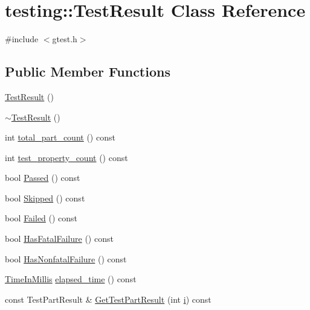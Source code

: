 \hypertarget{classtesting_1_1_test_result}{}\section{testing\+::Test\+Result Class Reference}
\label{classtesting_1_1_test_result}


{\ttfamily \#include $<$gtest.\+h$>$}

\subsection*{Public Member Functions}
\begin{DoxyCompactItemize}
\item 
\mbox{\hyperlink{classtesting_1_1_test_result_a5cf5dd6f416b7334ea601aab21a2fda5}{Test\+Result}} ()
\item 
\mbox{\hyperlink{classtesting_1_1_test_result_a41f407680b725b75d7eadc3230bc3315}{$\sim$\+Test\+Result}} ()
\item 
int \mbox{\hyperlink{classtesting_1_1_test_result_a6174aa4019dcda7c34d776b5741c9032}{total\+\_\+part\+\_\+count}} () const
\item 
int \mbox{\hyperlink{classtesting_1_1_test_result_afe4523257bbea8bc63b0950b702790be}{test\+\_\+property\+\_\+count}} () const
\item 
bool \mbox{\hyperlink{classtesting_1_1_test_result_acf7e6e72f05a0545c48ea48e7f8851df}{Passed}} () const
\item 
bool \mbox{\hyperlink{classtesting_1_1_test_result_a4c9e954e0f8c1386206f2e6208c45244}{Skipped}} () const
\item 
bool \mbox{\hyperlink{classtesting_1_1_test_result_afacc37e8b43c8574e4101bc61723c769}{Failed}} () const
\item 
bool \mbox{\hyperlink{classtesting_1_1_test_result_a30e00d4076ae07fb5ad7b623d9dc1fe4}{Has\+Fatal\+Failure}} () const
\item 
bool \mbox{\hyperlink{classtesting_1_1_test_result_a510564fa67b485ed4589a259f2a032d6}{Has\+Nonfatal\+Failure}} () const
\item 
\mbox{\hyperlink{namespacetesting_a992de1d091ce660f451d1e8b3ce30fd6}{Time\+In\+Millis}} \mbox{\hyperlink{classtesting_1_1_test_result_a717e05e00d4af5cb809433e343ab63af}{elapsed\+\_\+time}} () const
\item 
const Test\+Part\+Result \& \mbox{\hyperlink{classtesting_1_1_test_result_a765c1e734ac08115757b343d57226bba}{Get\+Test\+Part\+Result}} (int \mbox{\hyperlink{_obj__test_2lib_2googletest-master_2googlemock_2test_2gmock-matchers__test_8cc_acb559820d9ca11295b4500f179ef6392}{i}}) const

\end{DoxyCompactItemize}
